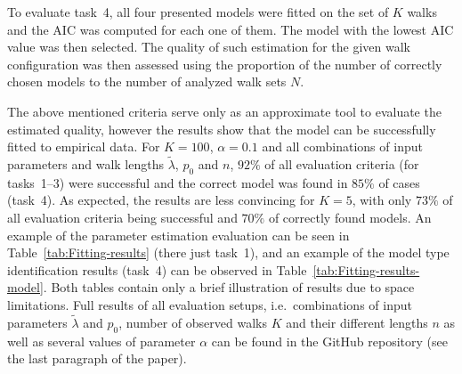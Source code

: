 To evaluate task~4, all four presented models were fitted on the set of $K$ walks and the AIC was computed for each one of them.
The model with the lowest AIC value was then selected.
The quality of such estimation for the given walk configuration was then assessed using the proportion of the number of correctly chosen models to the number of analyzed walk sets $N$.

The above mentioned criteria serve only as an approximate tool to evaluate the estimated quality, however the results show that the model can be successfully fitted to empirical data.
For $K=100$, $\alpha=0.1$ and all combinations of input parameters and walk lengths $\tilde{\lambda}$, $p_0$ and $n$, $92\%$ of all evaluation criteria (for tasks~1--3) were successful and the correct model was found in $85\%$ of cases (task~4).
As expected, the results are less convincing for $K=5$, with only $73\%$ of all evaluation criteria being successful and $70\%$ of correctly found models.
An example of the parameter estimation evaluation can be seen in Table~\ref{tab:Fitting-results} (there just task~1), and an example of the model type identification results (task~4) can be observed in Table~\ref{tab:Fitting-results-model}.
Both tables contain only a brief illustration of results due to space limitations.
Full results of all evaluation setups, i.e.~combinations of input parameters $\tilde{\lambda}$ and $p_0$, number of observed walks $K$ and their different lengths $n$ as well as several values of parameter $\alpha$ can be found in the GitHub repository (see the last paragraph of the paper).

